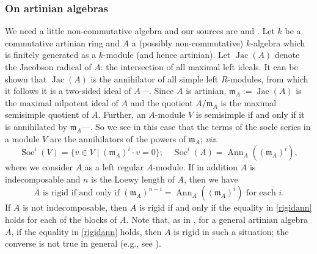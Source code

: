 \documentclass[11pt,reqno]{amsart}
\theoremstyle{definition}
\theoremstyle{remark}
\theoremstyle{definition}
\theoremstyle{plain}
\DeclareMathOperator{\Soc}{Soc}
\DeclareMathOperator{\Ann}{Ann}
\DeclareMathOperator{\Jac}{Jac}
\newcommand{\m}{\mathfrak{m}}
\begin{document}
\subsubsection{On artinian algebras}\label{sec:artin} We need a little non-commutative algebra and our sources are \cite{Lam1} and \cite{Lam2}.
Let $k$ be a commutative artinian ring and $A$ a (possibly non-commutative) $k$-algebra which is finitely generated as a $k$-module (and hence artinian).
Let $\Jac(A)$ denote the Jacobson radical of $A$: the intersection of all maximal left ideals. It can be shown that $\Jac(A)$ is the annihilator of all simple left $R$-modules, from which it follows it is  a two-sided ideal of $A$---\hspace{1sp}\cite[\S4]{Lam1}.
Since $A$ is artinian, $\m_A:=\Jac(A)$ is the maximal nilpotent ideal of $A$ and the quotient $A/\m_A$ is the maximal semisimple quotient of $A$.
Further, an $A$-module $V$ is semisimple if and only if it is annihilated by $\m_A$---\hspace{1sp}\cite[Ex.~4.18]{Lam1}. 
So we see in this case that the terms of the socle series in a module $V$ are the annihilators of the powers of $\m_A$; \emph{viz.~}
\[\Soc^i(V)=\{v\in V\mid (\m_A)^i\cdot v=0\};\quad \Soc^i(A)=\Ann_A((\m_A)^i) ,\]
where we consider $A$ as a left regular $A$-module. If in addition $A$ is indecomposable \cite[\S22]{Lam1} and $n$ is the Loewy length of $A$, then we have
\begin{equation}\text{$A$ is rigid if and only if $(\m_A)^{n-i} = \Ann_A((\m_A)^i)$ for each $i$.}\label{rigidann}\end{equation}
If $A$ is not indecomposable, then $A$ is rigid if and only if the equality in \eqref{rigidann} holds for each of the blocks of $A$.
Note that, as in , for a general artinian algebra $A$, if the equality in \eqref{rigidann} holds, then $A$ is rigid in such a situation;
the converse is not true in general (e.g., see ).
\end{document}
